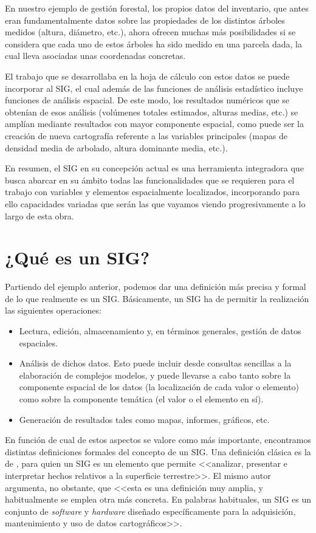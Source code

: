En nuestro ejemplo de gestión forestal, los propios datos del inventario, que antes eran fundamentalmente datos sobre las propiedades de los distintos árboles medidos (altura, diámetro, etc.), ahora ofrecen muchas más posibilidades si se considera que cada uno de estos árboles ha sido medido en una parcela dada, la cual lleva asociadas unas coordenadas concretas.

El trabajo que se desarrollaba en la hoja de cálculo con estos datos se puede incorporar al SIG, el cual además de las funciones de análisis estadístico incluye funciones de análisis espacial. De este modo, los resultados numéricos que se obtenían de esos análisis (volúmenes totales estimados, alturas medias, etc.) se amplían mediante resultados con mayor componente espacial, como puede ser la creación de nueva cartografía referente a las variables principales (mapas de densidad media de arbolado, altura dominante media, etc.). 

En resumen, el SIG en su concepción actual es una herramienta integradora que busca abarcar en su ámbito todas las funcionalidades que se requieren para el trabajo con variables y elementos espacialmente localizados, incorporando para ello capacidades variadas que serán las que vayamos viendo progresivamente a lo largo de esta obra.

\section{¿Qué es un SIG?}

Partiendo del ejemplo anterior, podemos dar una definición más precisa y formal de lo que realmente es un SIG. Básicamente, un SIG ha de permitir la realización las siguientes operaciones:

\begin{itemize}
	\item Lectura, edición, almacenamiento y, en términos generales, gestión de datos espaciales.
	\item Análisis de dichos datos. Esto puede incluir desde consultas sencillas a la elaboración de complejos modelos, y puede llevarse a cabo tanto sobre la componente espacial de los datos (la localización de cada valor o elemento) como sobre la componente temática (el valor o el elemento en sí).
	\item Generación de resultados tales como mapas, informes, gráficos, etc.
\end{itemize}

En función de cual de estos aspectos se valore como más importante, encontramos distintas definiciones formales del concepto de un SIG. Una definición clásica es la de \cite{Tomlin1990Prentice}, para quien un SIG es un elemento que permite <<analizar, presentar e interpretar hechos relativos a la superficie terrestre>>. El mismo autor argumenta, no obstante, que <<esta es una definición muy amplia, y habitualmente se emplea otra más concreta. En palabras habituales, un SIG es un conjunto de \emph{software} y \emph{hardware} diseñado específicamente para la adquisición, mantenimiento y uso de datos cartográficos>>.

